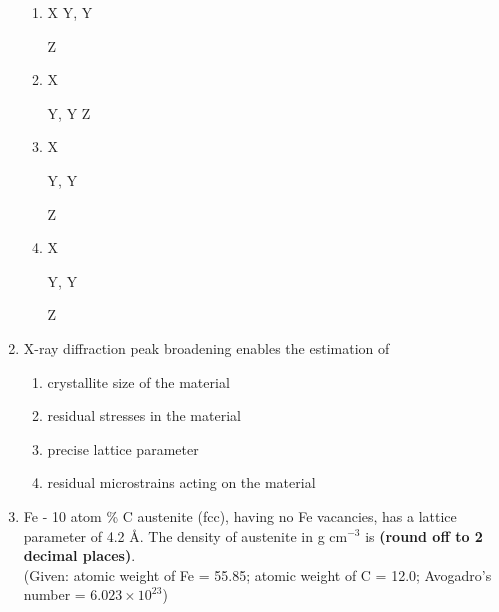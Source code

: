 \documentclass[journal]{IEEEtran}
\numberwithin{equation}{enumi}
\numberwithin{figure}{enumi}
\begin{document}
\begin{enumerate}[start=53]
    \begin{enumerate}
        \item X \raisebox{1ex}{\rule{0.5cm}{0.4pt}} Y, Y  Z
        \item X  Y, Y \raisebox{1ex}{\rule{0.5cm}{0.4pt}} Z
        \item X  Y, Y  Z
        \item X  Y, Y  Z
    \end{enumerate}

    \item X-ray diffraction peak broadening enables the estimation of
    \begin{enumerate}
        \item crystallite size of the material
        \item residual stresses in the material
        \item precise lattice parameter
        \item residual microstrains acting on the material
    \end{enumerate}
    \item Fe - 10 atom \% C austenite (fcc), having no Fe vacancies, has a lattice parameter of 4.2 Å. The density of austenite in g cm$^{-3}$ is \textbf{(round off to 2 decimal places)}. \\
    (Given: atomic weight of Fe = 55.85; atomic weight of C = 12.0; Avogadro's number = $6.023 \times 10^{23}$)


\end{enumerate}
\end{document}
